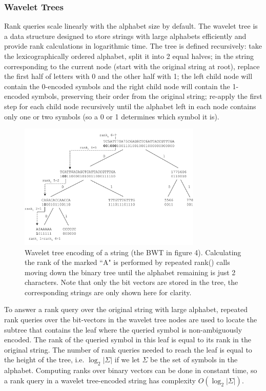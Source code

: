 \documentclass[runningheads,a4paper]{llncs}
\begin{document}
\subsubsection{Wavelet Trees}
Rank queries scale linearly with the alphabet size by default. The wavelet tree \cite{wt} is a data structure designed to store strings with large alphabets efficiently and provide rank calculations in logarithmic time. The tree is defined recursively: take the lexicographically ordered alphabet, split it into 2 equal halves; in the string corresponding to the current node (start with the original string at root), replace the first half of letters with 0 and the other half with 1; the left child node will contain the 0-encoded symbols and the right child node will contain the 1-encoded symbols, preserving their order from the original string; re-apply the first step for each child node recursively until the alphabet left in each node contains only one or two symbols (so a 0 or 1 determines which symbol it is).

 \begin{figure}
\centering
\includegraphics[height=6cm]{wavelet_tree.png}
\caption{Wavelet tree encoding of a string (the BWT in figure 4). Calculating the rank of the marked ``A" is performed by repeated rank() calls moving down the binary tree until the alphabet remaining is just 2 characters. Note that only the bit vectors are stored in the tree, the corresponding strings are only shown here for clarity. }
\label{fig:wt}
\end{figure}

To answer a rank query over the original string with large alphabet, repeated rank queries over the bit-vectors in the wavelet tree nodes are used to locate the subtree that contains the leaf where the queried symbol is non-ambiguously encoded. The rank of the queried symbol in this leaf is equal to its rank in the original string. The number of rank queries needed to reach the leaf is equal to the height of the tree, i.e. $\log_{2} {|\Sigma|}$ if we let $\Sigma$ be the set of symbols in the alphabet. Computing ranks over binary vectors can be done in constant time, so a rank query in a wavelet tree-encoded string has complexity $O(\log_{2} {|\Sigma|})$. 
\end{document}
